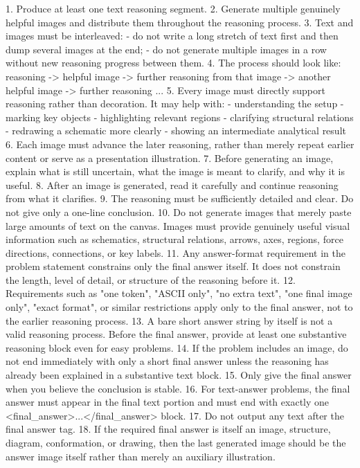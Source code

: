 \documentclass[11pt]{article}
\begin{document}
\begin{tcolorbox}
\begin{tcblisting}
1. Produce at least one text reasoning segment.
2. Generate multiple genuinely helpful images and distribute them throughout the reasoning process.
3. Text and images must be interleaved:
   - do not write a long stretch of text first and then dump several images at the end;
   - do not generate multiple images in a row without new reasoning progress between them.
4. The process should look like:
   reasoning -> helpful image -> further reasoning from that image -> another helpful image -> further reasoning ...
5. Every image must directly support reasoning rather than decoration. It may help with:
   - understanding the setup
   - marking key objects
   - highlighting relevant regions
   - clarifying structural relations
   - redrawing a schematic more clearly
   - showing an intermediate analytical result
6. Each image must advance the later reasoning, rather than merely repeat earlier content or serve as a presentation illustration.
7. Before generating an image, explain what is still uncertain, what the image is meant to clarify, and why it is useful.
8. After an image is generated, read it carefully and continue reasoning from what it clarifies.
9. The reasoning must be sufficiently detailed and clear. Do not give only a one-line conclusion.
10. Do not generate images that merely paste large amounts of text on the canvas. Images must provide genuinely useful visual information such as schematics, structural relations, arrows, axes, regions, force directions, connections, or key labels.
11. Any answer-format requirement in the problem statement constrains only the final answer itself. It does not constrain the length, level of detail, or structure of the reasoning before it.
12. Requirements such as "one token", "ASCII only", "no extra text", "one final image only", "exact format", or similar restrictions apply only to the final answer, not to the earlier reasoning process.
13. A bare short answer string by itself is not a valid reasoning process. Before the final answer, provide at least one substantive reasoning block even for easy problems.
14. If the problem includes an image, do not end immediately with only a short final answer unless the reasoning has already been explained in a substantive text block.
15. Only give the final answer when you believe the conclusion is stable.
16. For text-answer problems, the final answer must appear in the final text portion and must end with exactly one <final_answer>...</final_answer> block.
17. Do not output any text after the final answer tag.
18. If the required final answer is itself an image, structure, diagram, conformation, or drawing, then the last generated image should be the answer image itself rather than merely an auxiliary illustration.

\end{tcblisting}
\end{tcolorbox}
\end{document}
